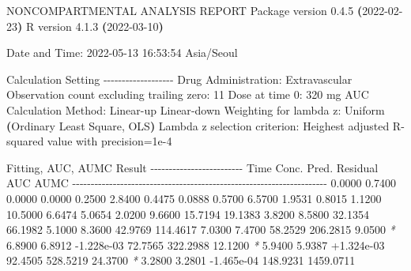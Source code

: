 \documentclass[
  11pt,
  krantz2, a4paper, twoside]{krantz}
\newenvironment{Shaded}{\begin{snugshade}}{\end{snugshade}}
\newcommand{\AttributeTok}[1]{\textcolor[rgb]{0.77,0.63,0.00}{#1}}
\newcommand{\ErrorTok}[1]{\textcolor[rgb]{0.64,0.00,0.00}{\textbf{#1}}}
\newcommand{\ExtensionTok}[1]{#1}
\newcommand{\KeywordTok}[1]{\textcolor[rgb]{0.13,0.29,0.53}{\textbf{#1}}}
\newcommand{\NormalTok}[1]{#1}
\newcommand{\PreprocessorTok}[1]{\textcolor[rgb]{0.56,0.35,0.01}{\textit{#1}}}
\theoremstyle{definition}
\theoremstyle{definition}
\theoremstyle{definition}
\theoremstyle{definition}
\theoremstyle{remark}
\begin{document}
\footnotesize

\begin{Shaded}
\begin{Highlighting}[]
                        \ExtensionTok{NONCOMPARTMENTAL}\NormalTok{ ANALYSIS REPORT}
                       \ExtensionTok{Package}\NormalTok{ version 0.4.5 }\ErrorTok{(}\ExtensionTok{2022{-}02{-}23}\KeywordTok{)}
                          \ExtensionTok{R}\NormalTok{ version 4.1.3 }\ErrorTok{(}\ExtensionTok{2022{-}03{-}10}\KeywordTok{)}

\ExtensionTok{Date}\NormalTok{ and Time: 2022{-}05{-}13 16:53:54 Asia/Seoul}

\ExtensionTok{Calculation}\NormalTok{ Setting}
\ExtensionTok{{-}{-}{-}{-}{-}{-}{-}{-}{-}{-}{-}{-}{-}{-}{-}{-}{-}{-}{-}}
\ExtensionTok{Drug}\NormalTok{ Administration: Extravascular}
\ExtensionTok{Observation}\NormalTok{ count excluding trailing zero: 11}
\ExtensionTok{Dose}\NormalTok{ at time 0: 320 mg}
\ExtensionTok{AUC}\NormalTok{ Calculation Method: Linear{-}up Linear{-}down}
\ExtensionTok{Weighting}\NormalTok{ for lambda z: Uniform }\ErrorTok{(}\ExtensionTok{Ordinary}\NormalTok{ Least Square, OLS}\KeywordTok{)}
\ExtensionTok{Lambda}\NormalTok{ z selection criterion: Heighest adjusted R{-}squared value with precision=1e{-}4}


\ExtensionTok{Fitting,}\NormalTok{ AUC, AUMC Result}
\ExtensionTok{{-}{-}{-}{-}{-}{-}{-}{-}{-}{-}{-}{-}{-}{-}{-}{-}{-}{-}{-}{-}{-}{-}{-}{-}{-}}
      \ExtensionTok{Time}\NormalTok{         Conc.      Pred.   Residual       AUC       AUMC}
\ExtensionTok{{-}{-}{-}{-}{-}{-}{-}{-}{-}{-}{-}{-}{-}{-}{-}{-}{-}{-}{-}{-}{-}{-}{-}{-}{-}{-}{-}{-}{-}{-}{-}{-}{-}{-}{-}{-}{-}{-}{-}{-}{-}{-}{-}{-}{-}{-}{-}{-}{-}{-}{-}{-}{-}{-}{-}{-}{-}{-}{-}{-}{-}{-}{-}{-}{-}{-}{-}{-}{-}}
     \ExtensionTok{0.0000}\NormalTok{       0.7400                           0.0000     0.0000}
     \ExtensionTok{0.2500}\NormalTok{       2.8400                           0.4475     0.0888}
     \ExtensionTok{0.5700}\NormalTok{       6.5700                           1.9531     0.8015}
     \ExtensionTok{1.1200}\NormalTok{      10.5000                           6.6474     5.0654}
     \ExtensionTok{2.0200}\NormalTok{       9.6600                          15.7194    19.1383}
     \ExtensionTok{3.8200}\NormalTok{       8.5800                          32.1354    66.1982}
     \ExtensionTok{5.1000}\NormalTok{       8.3600                          42.9769   114.4617}
     \ExtensionTok{7.0300}\NormalTok{       7.4700                          58.2529   206.2815}
     \ExtensionTok{9.0500} \PreprocessorTok{*}\NormalTok{     6.8900     6.8912 }\AttributeTok{{-}1.228e{-}03}\NormalTok{    72.7565   322.2988}
    \ExtensionTok{12.1200} \PreprocessorTok{*}\NormalTok{     5.9400     5.9387 +1.324e{-}03    92.4505   528.5219}
    \ExtensionTok{24.3700} \PreprocessorTok{*}\NormalTok{     3.2800     3.2801 }\AttributeTok{{-}1.465e{-}04}\NormalTok{   148.9231  1459.0711}


\end{Highlighting}
\end{Shaded}
\end{document}
